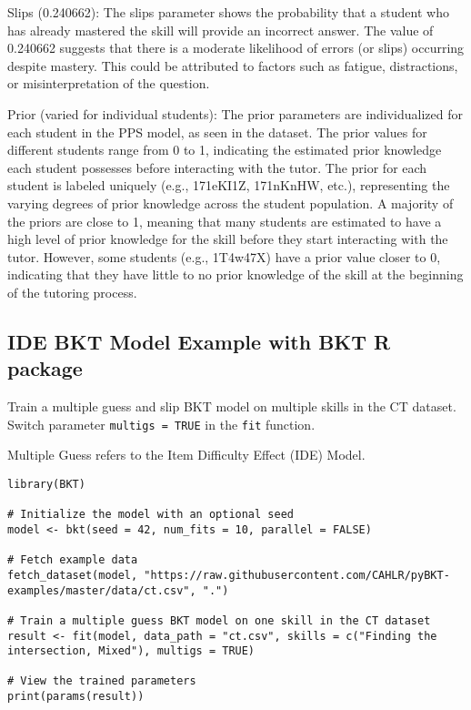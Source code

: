\documentclass{article}
\begin{document}
Slips (0.240662): The slips parameter shows the probability that a student who has already mastered the skill will provide an incorrect answer. The value of 0.240662 suggests that there is a moderate likelihood of errors (or slips) occurring despite mastery. This could be attributed to factors such as fatigue, distractions, or misinterpretation of the question.

Prior (varied for individual students): The prior parameters are individualized for each student in the PPS model, as seen in the dataset. The prior values for different students range from 0 to 1, indicating the estimated prior knowledge each student possesses before interacting with the tutor. The prior for each student is labeled uniquely (e.g., 171eKI1Z, 171nKnHW, etc.), representing the varying degrees of prior knowledge across the student population. A majority of the priors are close to 1, meaning that many students are estimated to have a high level of prior knowledge for the skill before they start interacting with the tutor. However, some students (e.g., 1T4w47X) have a prior value closer to 0, indicating that they have little to no prior knowledge of the skill at the beginning of the tutoring process.

\subsection{IDE BKT Model Example with BKT R package}

Train a multiple guess and slip BKT model on multiple skills in the CT dataset. Switch parameter \texttt{multigs = TRUE} in the \texttt{fit} function.

Multiple Guess refers to the Item Difficulty Effect (IDE) Model.

\begin{lstlisting}[caption={R code to train an ILE BKT model}]
library(BKT)

# Initialize the model with an optional seed
model <- bkt(seed = 42, num_fits = 10, parallel = FALSE)

# Fetch example data
fetch_dataset(model, "https://raw.githubusercontent.com/CAHLR/pyBKT-examples/master/data/ct.csv", ".")

# Train a multiple guess BKT model on one skill in the CT dataset
result <- fit(model, data_path = "ct.csv", skills = c("Finding the intersection, Mixed"), multigs = TRUE)

# View the trained parameters
print(params(result))
\end{lstlisting}
\end{document}
